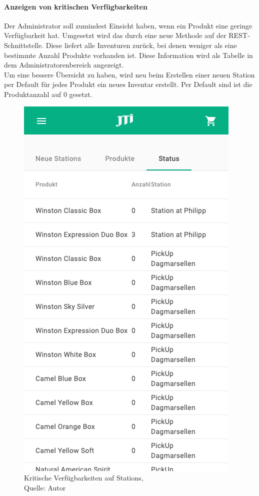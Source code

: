 \paragraph{Anzeigen von kritischen Verfügbarkeiten}\label{verfugbarkeiten}
Der Administrator soll zumindest Einsicht haben, wenn ein Produkt eine geringe Verfügbarkeit hat. Umgesetzt wird das durch eine neue Methode auf der \ac{REST}-Schnittstelle. Diese liefert alle Inventuren zurück, bei denen weniger als eine bestimmte Anzahl Produkte vorhanden ist. Diese Information wird als Tabelle in dem Administratorenbereich angezeigt. \\
Um eine bessere Übersicht zu haben, wird neu beim Erstellen einer neuen Station per Default für jedes Produkt ein neues Inventar erstellt. Per Default sind ist die Produktanzahl auf 0 gesetzt. 
\begin{figure}[H]
	\centering
	\includegraphics[scale=0.1]{images/stationStatus.png}
	\caption[Kritische Verfügbarkeiten auf Stations]{Kritische Verfügbarkeiten auf Stations,\\ Quelle: Autor}
	\label{img: stationStatus}
\end{figure} 

